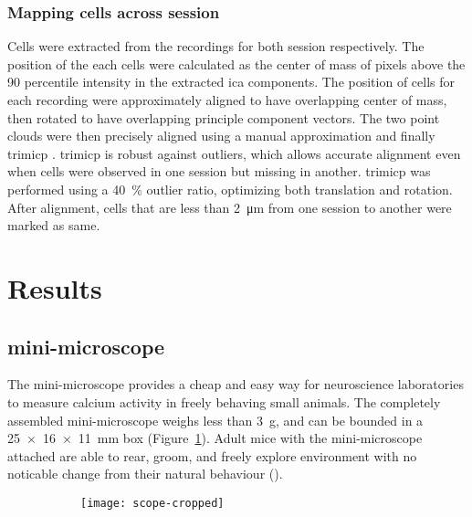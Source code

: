 \subsubsection{Mapping cells across session}
Cells were extracted from the recordings for both session respectively. The position of the each cells were calculated as the center of mass of pixels above the \num{90} percentile intensity in the extracted \gls{ica} components. The position of cells for each recording were approximately aligned to have overlapping center of mass, then rotated to have overlapping principle component vectors. The two point clouds were then precisely aligned using a manual approximation and finally \gls{trimicp} \citep{chetverikov02}. \Gls{trimicp} is robust against outliers, which allows accurate alignment even when cells were observed in one session but missing in another. \Gls{trimicp} was performed using a \SI{40}{\percent} outlier ratio, optimizing both translation and rotation. After alignment, cells that are less than \SI{2}{\um} from one session to another were marked as same. 


\section{Results}

\subsection{mini-microscope}
The mini-microscope provides a cheap and easy way for neuroscience laboratories to measure calcium activity in freely behaving small animals. The completely assembled mini-microscope weighs less than \SI{3}{\g}, and can be bounded in a \SI{25 x 16 x 11}{\mm} box (Figure~\ref{f.scope}). Adult mice with the mini-microscope attached are able to rear, groom, and freely explore environment with no noticable change from their natural behaviour ().

\begin{figure}[h]
    \begin{subfigure}[t]{.5\textwidth}
        \centering
        \texttt{[image: scope-cropped]}
        \caption{\label{f.scope}}
    \end{subfigure}
    \begin{subfigure}[t]{.5\textwidth}
        \centering
    \end{subfigure}
\end{figure}

